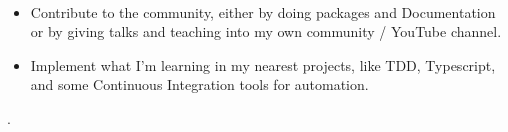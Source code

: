 \begin{cvtable}
\end{cvtable} \\


\begin{itemize}
    \item Contribute to the community, either by doing packages and Documentation or by giving talks and teaching into my own community / YouTube channel.
    \item Implement what I'm learning in my nearest projects, like TDD, Typescript, and some Continuous Integration tools for automation.
\end{itemize}


\cvsignature  \watermark.
